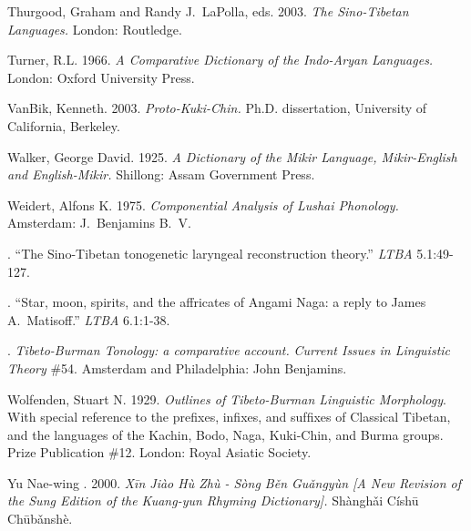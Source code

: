Thurgood, Graham and Randy J.~LaPolla, eds.
2003.
\textit{The Sino-Tibetan Languages.}
London: Routledge.

Turner, R.L.
1966.
\textit{A Comparative Dictionary of the Indo-Aryan Languages.}
London: Oxford University Press.

VanBik, Kenneth.
2003.
\textit{Proto-Kuki-Chin.}
Ph.D. dissertation, University of California, Berkeley.

Walker, George David.
1925.
\textit{A Dictionary of the Mikir Language, Mikir-English and English-Mikir.}
Shillong: Assam Government Press.

Weidert, Alfons K.
1975.
\textit{Componential Analysis of Lushai Phonology.}
Amsterdam: J.~Benjamins B.~V.

.
“The Sino-Tibetan tonogenetic laryngeal reconstruction theory.”
\textit{LTBA} 5.1:49-127.

.
“Star, moon, spirits, and the affricates of Angami Naga: a reply to James A.\ Matisoff.”
\textit{LTBA} 6.1:1-38.

.
\textit{Tibeto-Burman Tonology: a comparative account.}
\textit{Current Issues in Linguistic Theory} \#54. Amsterdam and Philadelphia: John Benjamins.

Wolfenden, Stuart N.
1929.
\textit{Outlines of Tibeto-Burman Linguistic Morphology}.
With special reference to the preﬁxes, inﬁxes, and sufﬁxes of Classical Tibetan, and the languages of the Kachin, Bodo, Naga, Kuki-Chin, and Burma groups. Prize Publication \#12. London: Royal Asiatic Society.

Yu Nae-wing .
2000.
 \textit{Xīn Jiào Hù Zhù - Sòng Běn Guǎngyùn [A New Revision of the Sung Edition of the Kuang-yun Rhyming Dictionary].}
 Shànghǎi Císhū Chūbǎnshè.

\label{pg:end-refs}

\cleartooddpage[\thispagestyle{empty}]
